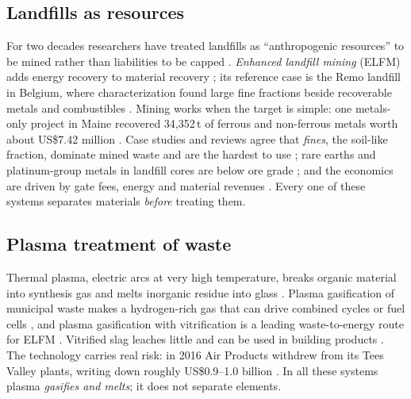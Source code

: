 \documentclass[11pt,a4paper]{article}
\begin{document}
\subsection{Landfills as resources}
For two decades researchers have treated landfills as ``anthropogenic resources'' to be mined rather than liabilities to be capped \citep{krook2012,winterstetter2015}. \emph{Enhanced landfill mining} (ELFM) adds energy recovery to material recovery \citep{jones2013}; its reference case is the Remo landfill in Belgium, where characterization found large fine fractions beside recoverable metals and combustibles \citep{quaghebeur2013}. Mining works when the target is simple: one metals-only project in Maine recovered 34,352\,t of ferrous and non-ferrous metals worth about US\$7.42 million \citep{wagner2015}. Case studies and reviews agree that \emph{fines}, the soil-like fraction, dominate mined waste and are the hardest to use \citep{kaartinen2013,hernandez2018,burlakovs2018}; rare earths and platinum-group metals in landfill cores are below ore grade \citep{gutierrez2015}; and the economics are driven by gate fees, energy and material revenues \citep{laner2019}. Every one of these systems separates materials \emph{before} treating them.

\subsection{Plasma treatment of waste}
Thermal plasma, electric arcs at very high temperature, breaks organic material into synthesis gas and melts inorganic residue into glass \citep{heberlein2008,gomez2009}. Plasma gasification of municipal waste makes a hydrogen-rich gas \citep{zhang2012,munir2019} that can drive combined cycles \citep{minutillo2009} or fuel cells \citep{galeno2011}, and plasma gasification with vitrification is a leading waste-to-energy route for ELFM \citep{bosmans2013,danthurebandara2015a}. Vitrified slag leaches little \citep{amutharani2008} and can be used in building products \citep{danthurebandara2015b,machiels2017}. The technology carries real risk: in 2016 Air Products withdrew from its Tees Valley plants, writing down roughly US\$0.9--1.0 billion \citep{icheme2016}. In all these systems plasma \emph{gasifies and melts}; it does not separate elements.
\end{document}
